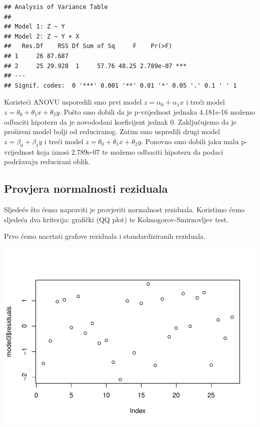 \documentclass[]{article}
\newenvironment{Shaded}{\begin{snugshade}}{\end{snugshade}}
\newcommand{\KeywordTok}[1]{\textcolor[rgb]{0.13,0.29,0.53}{\textbf{{#1}}}}
\newcommand{\NormalTok}[1]{{#1}}
\begin{document}
\begin{verbatim}
## Analysis of Variance Table
## 
## Model 1: Z ~ Y
## Model 2: Z ~ Y + X
##   Res.Df    RSS Df Sum of Sq     F    Pr(>F)    
## 1     26 87.687                                 
## 2     25 29.928  1     57.76 48.25 2.789e-07 ***
## ---
## Signif. codes:  0 '***' 0.001 '**' 0.01 '*' 0.05 '.' 0.1 ' ' 1
\end{verbatim}

Koristeći ANOVU usporedili smo prvi model \(z = \alpha_0 + \alpha_1 x
\) i treći model \(z = \theta_0 + \theta_1 x + \theta_2 y \). Pošto
smo dobili da je p-vrijednost jednaka 4.181e-16 možemo odbaciti hipotezu
da je novododani koeficijent jednak 0. Zaključujemo da je prošireni
model bolji od reduciranog. Zatim smo uspredili drugi model \(z =
\beta_0 + \beta_1 y \) i treći model \(z = \theta_0 + \theta_1 x +
\theta_2 y \). Ponovno smo dobili jaku malu p-vrijednost koja iznosi
2.789e-07 te možemo odbaciti hipotezu da podaci podržavaju reducirani
oblik.

\subsection{Provjera normalnosti
reziduala}\label{provjera-normalnosti-reziduala-2}

Sljedeće što ćemo napraviti je provjeriti normalnost reziduala.
Koristimo ćemo sljedeća dva kriterija: grafički (QQ plot) te
Kolmogorov-Smirnovljev test.

Prvo ćemo nacrtati grafove reziduala i standardiziranih reziduala.

\begin{Shaded}
\end{Shaded}

\includegraphics{Izvjestaj_files/figure-latex/unnamed-chunk-36-1.pdf}
\end{document}
